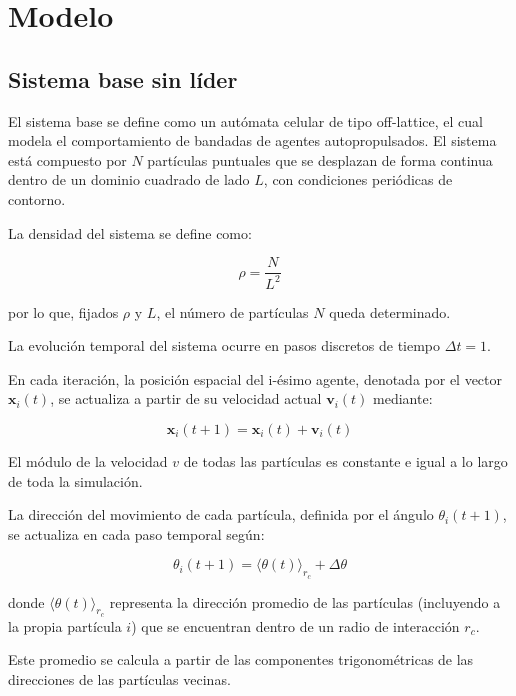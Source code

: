 \documentclass[a4paper,12pt]{article}
\begin{document}
\section{Modelo}

\subsection{Sistema base sin líder}

El sistema base se define como un autómata celular de tipo off-lattice, el cual modela el comportamiento de bandadas de agentes autopropulsados. El sistema está compuesto por $N$ partículas puntuales que se desplazan de forma continua dentro de un dominio cuadrado de lado $L$, con condiciones periódicas de contorno.

La densidad del sistema se define como:

\begin{equation}
	\rho = \frac{N}{L^2}
\end{equation}

por lo que, fijados $\rho$ y $L$, el número de partículas $N$ queda determinado.

La evolución temporal del sistema ocurre en pasos discretos de tiempo $\Delta t = 1$.

En cada iteración, la posición espacial del i-ésimo agente, denotada por el vector $\bm{x}_i(t)$, se actualiza a partir de su velocidad actual $\bm{v}_i(t)$ mediante:

\begin{equation}
	\bm{x}_i(t+1) = \bm{x}_i(t) + \bm{v}_i(t)
\end{equation}

El módulo de la velocidad $v$ de todas las partículas es constante e igual a lo largo de toda la simulación.

La dirección del movimiento de cada partícula, definida por el ángulo $\theta_i(t+1)$, se actualiza en cada paso temporal según:

\begin{equation}
	\theta_i(t+1) = \langle \theta(t) \rangle_{r_c} + \Delta \theta
\end{equation}

donde $\langle \theta(t) \rangle_{r_c}$ representa la dirección promedio de las partículas (incluyendo a la propia partícula $i$) que se encuentran dentro de un radio de interacción $r_c$.

Este promedio se calcula a partir de las componentes trigonométricas de las direcciones de las partículas vecinas.
\end{document}
